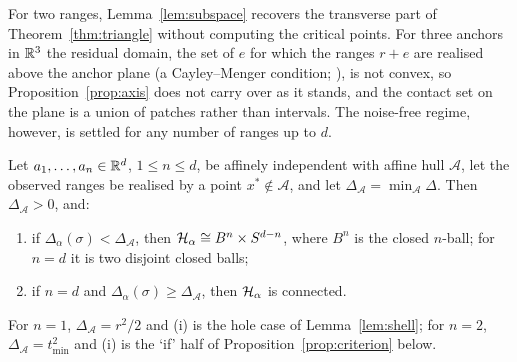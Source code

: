 For two ranges, Lemma~\ref{lem:subspace} recovers the transverse part of Theorem~\ref{thm:triangle} without computing
the critical points. For three anchors in $\mathbb{R}^3$ the residual domain, the set of $e$ for which the ranges $r + e$ are realised
above the anchor plane (a Cayley--Menger condition; \citealp{blumenthal1953,liberti2014}), is not convex, so Proposition~\ref{prop:axis} does not carry over as it stands, and the contact set on the plane is a
union of patches rather than intervals. The noise-free regime, however, is settled for any number of ranges up to $d$.

\begin{theorem}[Up to $d$ ranges]\label{thm:nranges}
Let $a_1, \dots, a_n \in \mathbb{R}^d$, $1 \le n \le d$, be affinely independent with affine hull $\mathcal A$, let the observed
ranges be realised by a point $x^* \notin \mathcal A$, and let $\Delta_{\mathcal A} = \min_{\mathcal A}\Delta$. Then
$\Delta_{\mathcal A} > 0$, and:
\begin{enumerate}[label=(\roman*)]
\item if $\Delta_\alpha(\sigma) < \Delta_{\mathcal A}$, then $\mathcal{H}_\alpha \cong B^n \times S^{d-n}$, where $B^n$ is the closed
$n$-ball; for $n = d$ it is two disjoint closed balls;
\item if $n = d$ and $\Delta_\alpha(\sigma) \ge \Delta_{\mathcal A}$, then $\mathcal{H}_\alpha$ is connected.
\end{enumerate}
For $n = 1$, $\Delta_{\mathcal A} = r^2/2$ and (i) is the hole case of Lemma~\ref{lem:shell}; for $n = 2$,
$\Delta_{\mathcal A} = t_{\min}^2$ and (i) is the `if' half of Proposition~\ref{prop:criterion} below.
\end{theorem}

